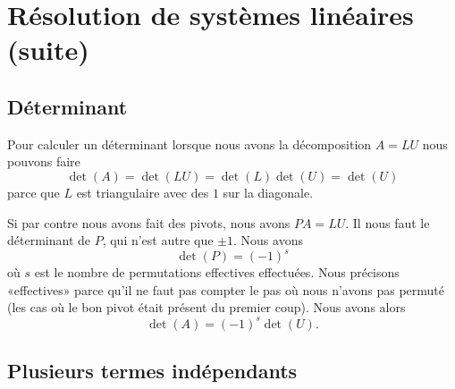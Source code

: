 
\section{Résolution de systèmes linéaires (suite)}

\subsection{Déterminant}

Pour calculer un déterminant lorsque nous avons la décomposition \( A=LU\) nous pouvons faire
\begin{equation}
    \det(A)=\det(LU)=\det(L)\det(U)=\det(U)
\end{equation}
parce que \( L\) est triangulaire avec des \( 1\) sur la diagonale.

Si par contre nous avons fait des pivots, nous avons \( PA=LU\). Il nous faut le déterminant de \( P\), qui n'est autre que \( \pm 1\). Nous avons
\begin{equation}
    \det(P)=(-1)^s
\end{equation}
où \( s\) est le nombre de permutations effectives effectuées. Nous précisons «effectives» parce qu'il ne faut pas compter le pas où nous n'avons pas permuté (les cas où le bon pivot était présent du premier coup). Nous avons alors
\begin{equation}
    \det(A)=(-1)^s\det(U).
\end{equation}

\subsection{Plusieurs termes indépendants}

